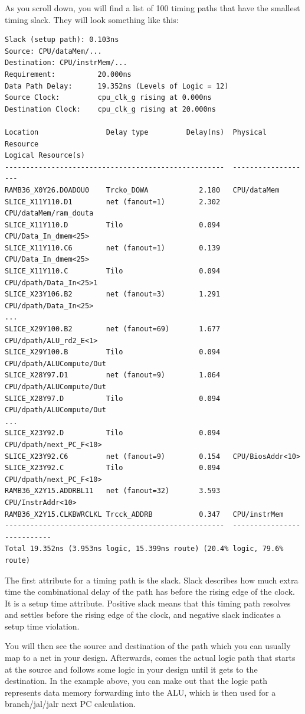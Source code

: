 \documentclass[11pt]{article}
\begin{document}
As you scroll down, you will find a list of 100 timing paths that have the smallest timing slack. They will look something like this:

\begin{verbatim}
Slack (setup path): 0.103ns
Source: CPU/dataMem/...
Destination: CPU/instrMem/...
Requirement:          20.000ns
Data Path Delay:      19.352ns (Levels of Logic = 12)
Source Clock:         cpu_clk_g rising at 0.000ns
Destination Clock:    cpu_clk_g rising at 20.000ns

Location                Delay type         Delay(ns)  Physical Resource
Logical Resource(s)
----------------------------------------------------  -------------------
RAMB36_X0Y26.DOADOU0    Trcko_DOWA            2.180   CPU/dataMem
SLICE_X11Y110.D1        net (fanout=1)        2.302   CPU/dataMem/ram_douta
SLICE_X11Y110.D         Tilo                  0.094   CPU/Data_In_dmem<25>
SLICE_X11Y110.C6        net (fanout=1)        0.139   CPU/Data_In_dmem<25>
SLICE_X11Y110.C         Tilo                  0.094   CPU/dpath/Data_In<25>1
SLICE_X23Y106.B2        net (fanout=3)        1.291   CPU/dpath/Data_In<25>
...
SLICE_X29Y100.B2        net (fanout=69)       1.677   CPU/dpath/ALU_rd2_E<1>
SLICE_X29Y100.B         Tilo                  0.094   CPU/dpath/ALUCompute/Out
SLICE_X28Y97.D1         net (fanout=9)        1.064   CPU/dpath/ALUCompute/Out
SLICE_X28Y97.D          Tilo                  0.094   CPU/dpath/ALUCompute/Out
...
SLICE_X23Y92.D          Tilo                  0.094   CPU/dpath/next_PC_F<10>
SLICE_X23Y92.C6         net (fanout=9)        0.154   CPU/BiosAddr<10>
SLICE_X23Y92.C          Tilo                  0.094   CPU/dpath/next_PC_F<10>
RAMB36_X2Y15.ADDRBL11   net (fanout=32)       3.593   CPU/InstrAddr<10>
RAMB36_X2Y15.CLKBWRCLKL Trcck_ADDRB           0.347   CPU/instrMem
----------------------------------------------------  ---------------------------
Total 19.352ns (3.953ns logic, 15.399ns route) (20.4% logic, 79.6% route)
\end{verbatim}

The first attribute for a timing path is the slack. Slack describes how much extra time the combinational delay of the path has before the rising edge of the clock. It is a setup time attribute. Positive slack means that this timing path resolves and settles before the rising edge of the clock, and negative slack indicates a setup time violation.

You will then see the source and destination of the path which you can usually map to a net in your design. Afterwards, comes the actual logic path that starts at the source and follows some logic in your design until it gets to the destination. In the example above, you can make out that the logic path represents data memory forwarding into the ALU, which is then used for a branch/jal/jalr next PC calculation.
\end{document}
